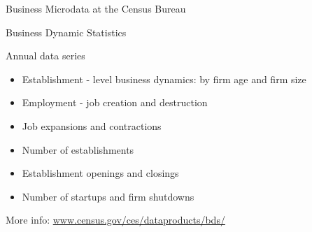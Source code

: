 \begin{frame}{Business Microdata at the Census Bureau}
\pause
{}
\end{frame}



\begin{frame}{Business Dynamic Statistics}
\begin{block}{Annual data series}
\begin{itemize}
\item Establishment - level business dynamics: by firm age and firm size
\item Employment - job creation and destruction
\item Job expansions and contractions
\item Number of establishments
\item Establishment openings and closings
\item Number of startups and firm shutdowns   
\end{itemize}
\end{block}
More info: \href{http://www.census.gov/ces/dataproducts/bds/}{www.census.gov/ces/dataproducts/bds/}
\end{frame}

